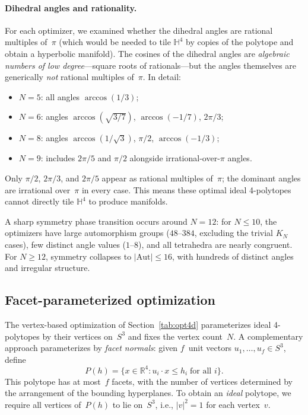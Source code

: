 \documentclass[11pt]{article}
\begin{document}
\paragraph{Dihedral angles and rationality.}
For each optimizer, we examined whether the dihedral angles are
rational multiples of~$\pi$ (which would be needed to tile
$\mathbb{H}^4$ by copies of the polytope and obtain a hyperbolic
manifold).  The cosines of the dihedral angles are
\emph{algebraic numbers of low degree}---square roots of
rationals---but the angles themselves are generically
\emph{not} rational multiples of~$\pi$.  In detail:
\begin{itemize}
\item $N=5$: all angles $\arccos(1/3)$;
\item $N=6$: angles $\arccos(\sqrt{3/7})$, $\arccos(-1/7)$, $2\pi/3$;
\item $N=8$: angles $\arccos(1/\!\sqrt{3})$, $\pi/2$, $\arccos(-1/3)$;
\item $N=9$: includes $2\pi/5$ and $\pi/2$ alongside irrational-over-$\pi$ angles.
\end{itemize}
Only $\pi/2$, $2\pi/3$, and $2\pi/5$ appear as rational multiples
of~$\pi$; the dominant angles are irrational over~$\pi$ in every
case.  This means these optimal ideal 4-polytopes cannot directly
tile $\mathbb{H}^4$ to produce manifolds.

A sharp symmetry phase transition occurs around $N = 12$:
for $N \le 10$, the optimizers have large automorphism groups
($48$--$384$, excluding the trivial $K_N$ cases), few distinct
angle values ($1$--$8$), and all tetrahedra are nearly congruent.
For $N \ge 12$, symmetry collapses to $|\mathrm{Aut}| \le 16$,
with hundreds of distinct angles and irregular structure.

\subsection{Facet-parameterized optimization}

The vertex-based optimization of Section~\ref{tab:opt4d}
parameterizes ideal 4-polytopes by their vertices on~$S^3$
and fixes the vertex count~$N$.  A complementary approach
parameterizes by \emph{facet normals}: given $f$~unit
vectors $u_1, \ldots, u_f \in S^3$, define
\[
  P(h) = \bigl\{ x \in \mathbb{R}^4 : u_i \cdot x \le h_i
  \;\text{for all } i \bigr\}.
\]
This polytope has at most~$f$ facets, with the number of vertices
determined by the arrangement of the bounding hyperplanes.
To obtain an \emph{ideal} polytope, we require all vertices of~$P(h)$
to lie on~$S^3$, i.e., $|v|^2 = 1$ for each vertex~$v$.
\end{document}
